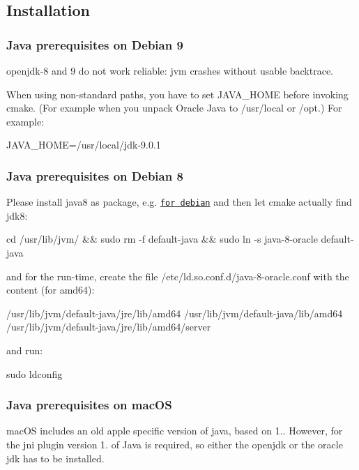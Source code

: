 \subsection*{Installation}

\subsubsection*{Java prerequisites on Debian 9}

openjdk-\/8 and 9 do not work reliable\+: jvm crashes without usable backtrace.

When using non-\/standard paths, you have to set J\+A\+V\+A\+\_\+\+H\+O\+ME before invoking cmake. (For example when you unpack Oracle Java to {\ttfamily /usr/local} or {\ttfamily /opt}.) For example\+: \begin{DoxyVerb} JAVA_HOME=/usr/local/jdk-9.0.1
\end{DoxyVerb}


\subsubsection*{Java prerequisites on Debian 8}

Please install java8 as package, e.\+g. \href{http://www.webupd8.org/2014/03/how-to-install-oracle-java-8-in-debian.html}{\tt for debian} and then let cmake actually find jdk8\+: \begin{DoxyVerb}cd /usr/lib/jvm/ && sudo rm -f default-java && sudo ln -s java-8-oracle default-java
\end{DoxyVerb}


and for the run-\/time, create the file {\ttfamily /etc/ld.so.\+conf.\+d/java-\/8-\/oracle.conf} with the content (for amd64)\+: \begin{DoxyVerb}/usr/lib/jvm/default-java/jre/lib/amd64
/usr/lib/jvm/default-java/lib/amd64
/usr/lib/jvm/default-java/jre/lib/amd64/server
\end{DoxyVerb}


and run\+: \begin{DoxyVerb}sudo ldconfig
\end{DoxyVerb}


\subsubsection*{Java prerequisites on mac\+OS}

mac\+OS includes an old apple specific version of java, based on 1.. However, for the jni plugin version 1. of Java is required, so either the openjdk or the oracle jdk has to be installed.

